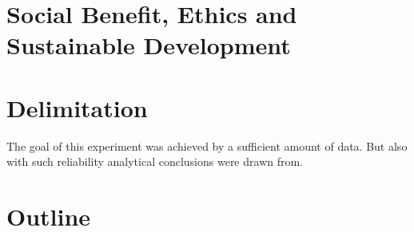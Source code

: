 \documentclass[a4paper,11pt]{kth-mag}
\begin{document}
\section{Social Benefit, Ethics and Sustainable Development}

\section{Delimitation}
The goal of this experiment was achieved by a sufficient amount of data.
But also with such reliability analytical conclusions were drawn from.

\section{Outline}


%
\end{document}
